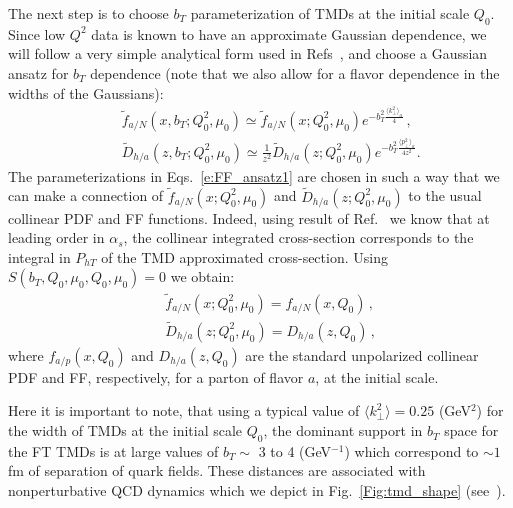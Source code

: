 \documentclass[final,3p,times,onecolumn,sort&compress,hidelinks]{elsarticle}
\newcommand{\crd}{\color{red}}
\begin{document}


The next step is to choose $b_T$ parameterization of TMDs at the initial scale $Q_0$.
 Since low $Q^2$ data is known \cite{Schweitzer:2010tt} to have an approximate Gaussian dependence, we will follow a very simple analytical form used in Refs~\cite{Anselmino:2013lza,Signori:2013mda}, and choose a Gaussian ansatz for $b_T$ dependence (note that we also allow for a flavor dependence in the widths of the Gaussians):
\begin{eqnarray}
&&\tilde f_{a/N} (x,b_T; Q_0^2, \mu_0)\simeq  \tilde f_{a/N} (x; Q_0^2, \mu_0) e^{-b_T^2 \frac{\langle k_\perp^2 \rangle_a}{4}}\,,
\nonumber \\[0.3cm]
&&\tilde D_{h/a}(z,b_T; Q_0^2, \mu_0)\simeq \frac{1}{z^2}  \tilde D_{h/a}(z; Q_0^2, \mu_0) e^{-b_T^2 \frac{\langle p_\perp^2 \rangle_a}{4 z^2}}.
\label{e:FF_ansatz1}
\end{eqnarray}
The parameterizations in Eqs.~\eqref{e:FF_ansatz1} are chosen in such a way that we can make a connection of $\tilde f_{a/N} (x; Q_0^2, \mu_0)$ and $\tilde D_{h/a}(z; Q_0^2, \mu_0)$ to the usual collinear PDF and FF functions. Indeed, using result of Ref.~\cite{Collins:2016hqq} we know that at leading order in $\alpha_s$, the collinear integrated cross-section corresponds to the integral in $P_{hT}$ of the TMD approximated cross-section. Using $S(b_T, Q_0, \mu_0, Q_0, \mu_0) = 0$ we obtain:
\begin{eqnarray}
&&\tilde f_{a/N} (x; Q_0^2, \mu_0) = f_{a/N} (x, Q_0)\,,
\\[0.3cm]
&&\tilde D_{h/a}(z; Q_0^2, \mu_0) = D_{h/a}(z, Q_0)\,,
\label{e:FF_ansatz2}
\end{eqnarray}
where $f_{a/p} (x, Q_0)$ and $D_{h/a}(z, Q_0)$ are the standard unpolarized collinear PDF and FF, respectively, for a parton of flavor $a$, at the initial scale.


Here it is important to note, that using a typical value of $\langle k_\perp^2 \rangle = 0.25$ (GeV$^2$) \cite{Anselmino:2005nn} for the width of TMDs at the initial scale $Q_0$, the dominant support in $b_T$ space  for the FT TMDs is at large values of $b_T \sim $ 3 to 4 (GeV$^{-1}$) which correspond to $\sim 1$ fm of separation of quark fields.  These distances are associated with nonperturbative QCD dynamics which we  depict in Fig.~\ref{Fig:tmd_shape}  (see~\cite{Aidala:2014hva}).
\end{document}
